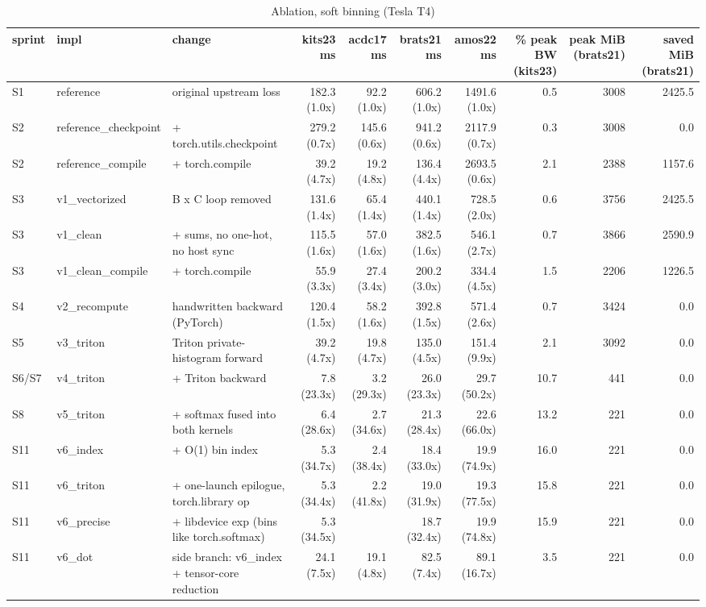 \begin{table}[t]
\centering\small
\begin{tabular}{lllrrrrrrr}
\toprule
sprint & impl & change & kits23 ms & acdc17 ms & brats21 ms & amos22 ms & \% peak BW (kits23) & peak MiB (brats21) & saved MiB (brats21) \\
\midrule
S1 & reference & original upstream loss & 182.3 (1.0x) & 92.2 (1.0x) & 606.2 (1.0x) & 1491.6 (1.0x) & 0.5 & 3008 & 2425.5 \\
S2 & reference\_checkpoint & + torch.utils.checkpoint & 279.2 (0.7x) & 145.6 (0.6x) & 941.2 (0.6x) & 2117.9 (0.7x) & 0.3 & 3008 & 0.0 \\
S2 & reference\_compile & + torch.compile & 39.2 (4.7x) & 19.2 (4.8x) & 136.4 (4.4x) & 2693.5 (0.6x) & 2.1 & 2388 & 1157.6 \\
S3 & v1\_vectorized & B x C loop removed & 131.6 (1.4x) & 65.4 (1.4x) & 440.1 (1.4x) & 728.5 (2.0x) & 0.6 & 3756 & 2425.5 \\
S3 & v1\_clean & + sums, no one-hot, no host sync & 115.5 (1.6x) & 57.0 (1.6x) & 382.5 (1.6x) & 546.1 (2.7x) & 0.7 & 3866 & 2590.9 \\
S3 & v1\_clean\_compile & + torch.compile & 55.9 (3.3x) & 27.4 (3.4x) & 200.2 (3.0x) & 334.4 (4.5x) & 1.5 & 2206 & 1226.5 \\
S4 & v2\_recompute & handwritten backward (PyTorch) & 120.4 (1.5x) & 58.2 (1.6x) & 392.8 (1.5x) & 571.4 (2.6x) & 0.7 & 3424 & 0.0 \\
S5 & v3\_triton & Triton private-histogram forward & 39.2 (4.7x) & 19.8 (4.7x) & 135.0 (4.5x) & 151.4 (9.9x) & 2.1 & 3092 & 0.0 \\
S6/S7 & v4\_triton & + Triton backward & 7.8 (23.3x) & 3.2 (29.3x) & 26.0 (23.3x) & 29.7 (50.2x) & 10.7 & 441 & 0.0 \\
S8 & v5\_triton & + softmax fused into both kernels & 6.4 (28.6x) & 2.7 (34.6x) & 21.3 (28.4x) & 22.6 (66.0x) & 13.2 & 221 & 0.0 \\
S11 & v6\_index & + O(1) bin index & 5.3 (34.7x) & 2.4 (38.4x) & 18.4 (33.0x) & 19.9 (74.9x) & 16.0 & 221 & 0.0 \\
S11 & v6\_triton & + one-launch epilogue, torch.library op & 5.3 (34.4x) & 2.2 (41.8x) & 19.0 (31.9x) & 19.3 (77.5x) & 15.8 & 221 & 0.0 \\
S11 & v6\_precise & + libdevice exp (bins like torch.softmax) & 5.3 (34.5x) &  & 18.7 (32.4x) & 19.9 (74.8x) & 15.9 & 221 & 0.0 \\
S11 & v6\_dot & side branch: v6\_index + tensor-core reduction & 24.1 (7.5x) & 19.1 (4.8x) & 82.5 (7.4x) & 89.1 (16.7x) & 3.5 & 221 & 0.0 \\
\bottomrule
\end{tabular}
\caption{Ablation, soft binning (Tesla T4)}
\end{table}